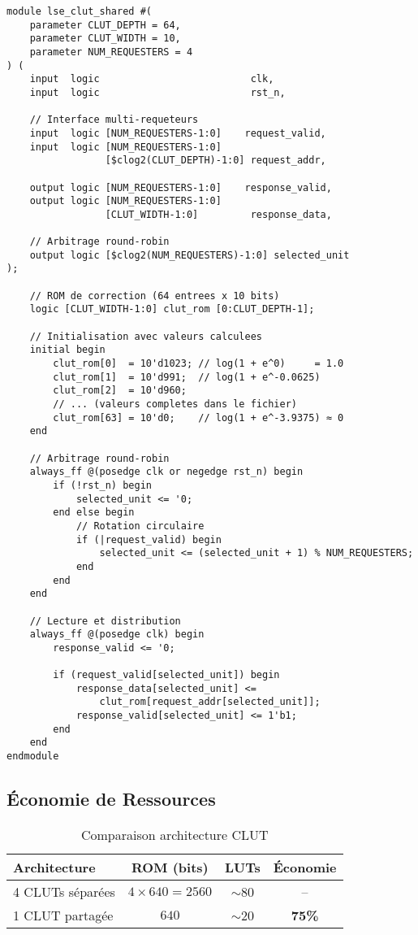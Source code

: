 \documentclass[12pt,a4paper]{article}
\begin{document}
\begin{lstlisting}[style=verilog, caption={Module lse\_clut\_shared.sv}]
module lse_clut_shared #(
    parameter CLUT_DEPTH = 64,
    parameter CLUT_WIDTH = 10,
    parameter NUM_REQUESTERS = 4
) (
    input  logic                          clk,
    input  logic                          rst_n,
    
    // Interface multi-requeteurs
    input  logic [NUM_REQUESTERS-1:0]    request_valid,
    input  logic [NUM_REQUESTERS-1:0]
                 [$clog2(CLUT_DEPTH)-1:0] request_addr,
    
    output logic [NUM_REQUESTERS-1:0]    response_valid,
    output logic [NUM_REQUESTERS-1:0]
                 [CLUT_WIDTH-1:0]         response_data,
    
    // Arbitrage round-robin
    output logic [$clog2(NUM_REQUESTERS)-1:0] selected_unit
);

    // ROM de correction (64 entrees x 10 bits)
    logic [CLUT_WIDTH-1:0] clut_rom [0:CLUT_DEPTH-1];
    
    // Initialisation avec valeurs calculees
    initial begin
        clut_rom[0]  = 10'd1023; // log(1 + e^0)     = 1.0
        clut_rom[1]  = 10'd991;  // log(1 + e^-0.0625)
        clut_rom[2]  = 10'd960;
        // ... (valeurs completes dans le fichier)
        clut_rom[63] = 10'd0;    // log(1 + e^-3.9375) ≈ 0
    end
    
    // Arbitrage round-robin
    always_ff @(posedge clk or negedge rst_n) begin
        if (!rst_n) begin
            selected_unit <= '0;
        end else begin
            // Rotation circulaire
            if (|request_valid) begin
                selected_unit <= (selected_unit + 1) % NUM_REQUESTERS;
            end
        end
    end
    
    // Lecture et distribution
    always_ff @(posedge clk) begin
        response_valid <= '0;
        
        if (request_valid[selected_unit]) begin
            response_data[selected_unit] <= 
                clut_rom[request_addr[selected_unit]];
            response_valid[selected_unit] <= 1'b1;
        end
    end
endmodule
\end{lstlisting}

\subsection{Économie de Ressources}

\begin{table}[h]
\centering
\caption{Comparaison architecture CLUT}
\begin{tabular}{|l|c|c|c|}
\hline
\textbf{Architecture} & \textbf{ROM (bits)} & \textbf{LUTs} & \textbf{Économie} \\
\hline
4 CLUTs séparées & $4 \times 640 = 2560$ & $\sim$80 & -- \\
1 CLUT partagée  & $640$ & $\sim$20 & \textbf{75\%} \\
\hline
\end{tabular}
\end{table}
\end{document}
